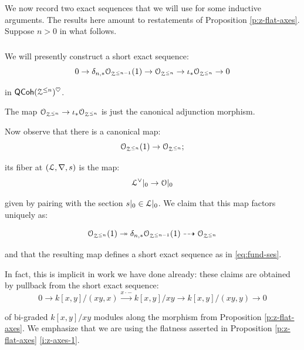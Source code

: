 \documentclass[reqno,11pt]{amsart}
\numberwithin{equation}{subsection}
\theoremstyle{remark}
\newcommand{\xar}[1]{\xrightarrow{#1}}
\newcommand{\onto}{\twoheadrightarrow}
\newcommand{\sL}{{\EuScript L}}
\newcommand{\sO}{{\EuScript O}}
\newcommand{\sZ}{{\EuScript Z}}
\newcommand{\heart}{\heartsuit}
\newcommand{\QCoh}{\mathsf{QCoh}}
\begin{document}
\subsubsection{}

We now record two exact sequences that we will use for some inductive arguments. 
The results here amount to restatements of Proposition \ref{p:z-flat-axes}.
Suppose $n > 0$ in what follows.

\subsubsection{}

We will presently construct a short exact sequence:
%
\begin{equation}\label{eq:fund-ses}
0 \to \delta_{n,*}\sO_{\sZ^{\leq n-1}}(1) 
\to \sO_{\sZ^{\leq n}} \to \iota_*\sO_{\sZ^{\leq n}} \to 0
\end{equation}

\noindent in $\QCoh(\sZ^{\leq n})^{\heart}$. 

The map $\sO_{\sZ^{\leq n}} \to \iota_*\sO_{\sZ^{\leq n}}$ is just the
canonical adjunction morphism.

Now observe that there is a canonical map:
%
\begin{equation}\label{eq:o(1)}
\sO_{\sZ^{\leq n}}(1) \to \sO_{\sZ^{\leq n}};
\end{equation}

\noindent its fiber at $(\sL,\nabla,s)$ is the map:
%
\[
\sL^{\vee}|_0 \to \sO|_0
\]

\noindent given by pairing with the section $s|_0 \in \sL|_0$. 
We claim that this map factors uniquely as:

\[
\sO_{\sZ^{\leq n}}(1) \onto \delta_{n,*}\sO_{\sZ^{\leq n-1}}(1) 
\dashrightarrow \sO_{\sZ^{\leq n}}
\]

\noindent and that the resulting map defines a short exact sequence 
as in \eqref{eq:fund-ses}.

In fact, this is implicit in work we have done already: these claims are 
obtained by pullback from the short exact sequence:
%
\[
0 \to k[x,y]/(xy,x) \xar{x \cdot -} k[x,y]/xy \to k[x,y]/(xy,y) \to 0
\]

\noindent of bi-graded $k[x,y]/xy$ modules along the morphism
from Proposition \ref{p:z-flat-axes}. We emphasize that we are using the 
flatness asserted in Proposition \ref{p:z-flat-axes} \eqref{i:z-axes-1}.
\end{document}

